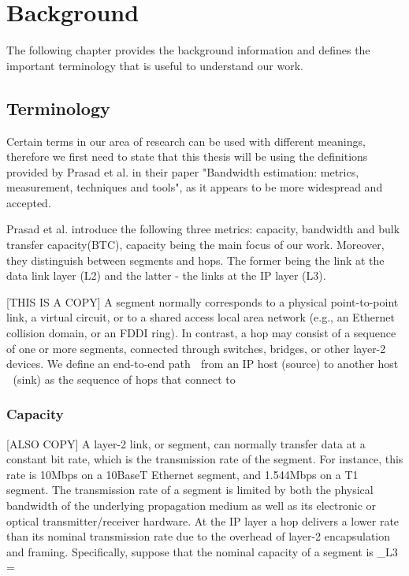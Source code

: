 \chapter{Background}
The following chapter provides the background information and defines the important terminology that is useful to understand our work.

\section{Terminology}
Certain terms in our area of research can be used with different meanings, therefore we first need to state that this thesis will be using the definitions provided by Prasad et al. \cite{prasad} in their paper "Bandwidth estimation: metrics, measurement, techniques and tools", as it appears to be more widespread and accepted.

Prasad et al. \cite{prasad} introduce the following three metrics: capacity, bandwidth and bulk transfer capacity(BTC), capacity being the main focus of our work.
Moreover, they distinguish between segments and hops. The former being the link at the data link layer (L2) and the latter - the links at the IP layer (L3).

[THIS IS A COPY]
A segment normally corresponds to a physical point-to-point link, a virtual circuit, or to a shared access local area network (e.g., an Ethernet collision
domain, or an FDDI ring). In contrast, a hop may consist of a sequence of one or more segments, connected through switches, bridges, or other layer-2 devices. We
define an end-to-end path  from an IP host (source) to another host  (sink) as the sequence of hops that connect to 

\subsection*{Capacity}
[ALSO COPY]
A layer-2 link, or segment, can normally transfer data at a constant bit rate, which is the transmission rate of the segment. For instance, this rate is 10Mbps
on a 10BaseT Ethernet segment, and 1.544Mbps on a T1 segment. The transmission rate of a segment is limited by both the physical bandwidth of the underlying
propagation medium as well as its electronic or optical transmitter/receiver hardware. 
At the IP layer a hop delivers a lower rate than its nominal transmission rate due to the overhead of layer-2 encapsulation and framing. Specifically, suppose that the nominal capacity of a segment is
\Delta _{L3} = 

